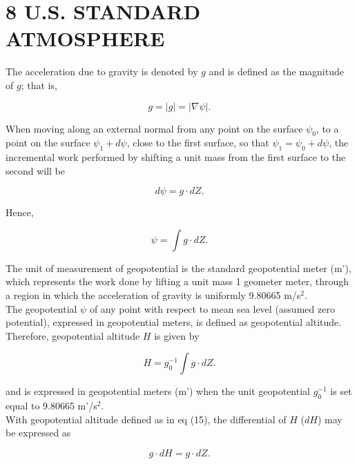 \documentclass{article}
\begin{document}
\section{8 U.S. STANDARD ATMOSPHERE} 

The acceleration due to gravity is denoted by \(g\) and is defined as the magnitude of \(g\); that is,

\begin{equation}
 g = |g| = |\nabla \psi|. \tag{12}
\end{equation}

When moving along an external normal from any point on the surface \(\psi_0\), to a point on the surface \(\psi_1+d\psi\), close to the first surface, so that \(\psi_1 = \psi_0 + d\psi\), the incremental work performed by shifting a unit mass from the first surface to the second will be

\begin{equation}
 d\psi = g \cdot dZ. \tag{13}
\end{equation}

Hence,

\begin{equation}
 \psi = \int g \cdot dZ . \tag{14}
\end{equation}

The unit of measurement of geopotential is the standard geopotential meter (m'), which represents the work done by lifting a unit mass 1 geometer meter, through a region in which the acceleration of gravity is uniformly 9.80665 m/s\(^2\). \\

The geopotential \(\psi\) of any point with respect to mean sea level (assumed zero potential), expressed in geopotential meters, is defined as geopotential altitude. \\
Therefore, geopotential altitude \(H\) is given by

\begin{equation}
 H = g_0^{-1} \int g \cdot dZ. \tag{15}
\end{equation}

and is expressed in geopotential meters (m') when the unit geopotential \(g_0^{-1}\) is set equal to 9.80665 m'/s\(^2\). \\

With geopotential altitude defined as in eq (15), the differential of \(H\) (\(dH\)) may be expressed as

\begin{equation}
 g\cdot dH = g\cdot dZ. \tag{16}
\end{equation}
\end{document}
